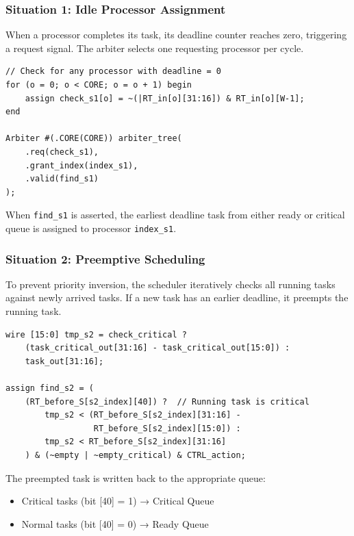 \documentclass[12pt,a4paper]{article}
\begin{document}
\subsubsection{Situation 1: Idle Processor Assignment}

When a processor completes its task, its deadline counter reaches zero, triggering a request signal. The arbiter selects one requesting processor per cycle.

\begin{lstlisting}[style=verilog, caption={Situation 1 Detection}]
// Check for any processor with deadline = 0
for (o = 0; o < CORE; o = o + 1) begin
    assign check_s1[o] = ~(|RT_in[o][31:16]) & RT_in[o][W-1];
end

Arbiter #(.CORE(CORE)) arbiter_tree(
    .req(check_s1),
    .grant_index(index_s1),
    .valid(find_s1)
);
\end{lstlisting}

When \texttt{find\_s1} is asserted, the earliest deadline task from either ready or critical queue is assigned to processor \texttt{index\_s1}.

\subsubsection{Situation 2: Preemptive Scheduling}

To prevent priority inversion, the scheduler iteratively checks all running tasks against newly arrived tasks. If a new task has an earlier deadline, it preempts the running task.

\begin{lstlisting}[style=verilog, caption={Situation 2 Preemption Logic}]
wire [15:0] tmp_s2 = check_critical ?
    (task_critical_out[31:16] - task_critical_out[15:0]) :
    task_out[31:16];

assign find_s2 = (
    (RT_before_S[s2_index][40]) ?  // Running task is critical
        tmp_s2 < (RT_before_S[s2_index][31:16] -
                  RT_before_S[s2_index][15:0]) :
        tmp_s2 < RT_before_S[s2_index][31:16]
    ) & (~empty | ~empty_critical) & CTRL_action;
\end{lstlisting}

The preempted task is written back to the appropriate queue:
\begin{itemize}
    \item Critical tasks (bit [40] = 1) → Critical Queue
    \item Normal tasks (bit [40] = 0) → Ready Queue
\end{itemize}
\end{document}
